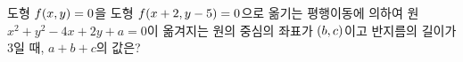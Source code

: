 도형 $f(x{,}\mkern3mu\mathopen{}y)=0$을 도형 $f(x+2{,}\mkern3mu\mathopen{}y-5)=0$으로 옮기는 평행이동에 의하여 원 $x^2+y^2-4x+2y+a=0$이 옮겨지는 원의 중심의 좌표가 $(b{,}\mkern3mu\mathopen{}c)$이고 반지름의 길이가 $3$일 때, $a+b+c$의 값은? 
